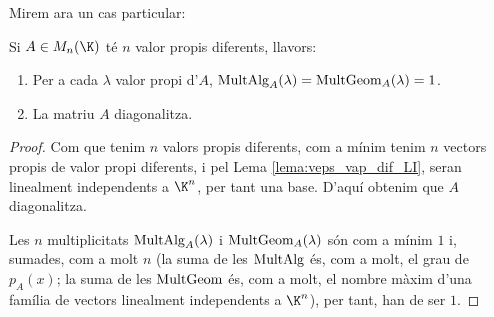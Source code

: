 Mirem ara un cas particular:
\begin{proposicio}\label{prop:n_vaps_diferents}
    Si $A \in M_n(\K)$ té $n$ valor propis diferents, llavors:
    \begin{enumerate}[\rm (a)]
        \item Per a cada $\lambda$ valor propi d'$A$, $\operatorname{MultAlg}_A(\lambda)=\operatorname{MultGeom}_A(\lambda)=1$.
        \item La matriu $A$ diagonalitza.
    \end{enumerate}
\end{proposicio}
\begin{proof}
Com que tenim $n$ valors propis diferents, com a mínim tenim $n$ vectors propis de valor propi diferents, i pel Lema \ref{lema:veps_vap_dif_LI}, seran linealment independents a $\K^n$, per tant una base. D'aquí obtenim que $A$ diagonalitza.

Les $n$ multiplicitats $\operatorname{MultAlg}_A(\lambda)$ i $\operatorname{MultGeom}_A(\lambda)$ són com a mínim $1$ i, sumades, com a molt $n$ (la suma de les $\operatorname{MultAlg}$ és, com a molt, el grau de $p_A(x)$; la suma de les $\operatorname{MultGeom}$ és, com a molt, el nombre màxim d'una família de vectors linealment independents a $\K^n$), per tant, han de ser $1$. 
\end{proof}

